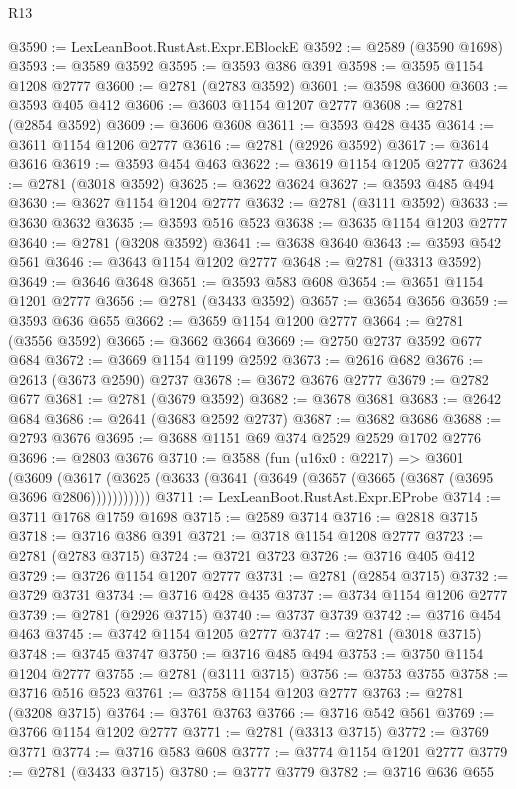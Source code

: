 \begin{lexlean}{R13}
\begin{coremodule}
@3590 := LexLeanBoot.RustAst.Expr.EBlockE
@3592 := @2589 (@3590 @1698)
@3593 := @3589 @3592
@3595 := @3593 @386 @391
@3598 := @3595 @1154 @1208 @2777
@3600 := @2781 (@2783 @3592)
@3601 := @3598 @3600
@3603 := @3593 @405 @412
@3606 := @3603 @1154 @1207 @2777
@3608 := @2781 (@2854 @3592)
@3609 := @3606 @3608
@3611 := @3593 @428 @435
@3614 := @3611 @1154 @1206 @2777
@3616 := @2781 (@2926 @3592)
@3617 := @3614 @3616
@3619 := @3593 @454 @463
@3622 := @3619 @1154 @1205 @2777
@3624 := @2781 (@3018 @3592)
@3625 := @3622 @3624
@3627 := @3593 @485 @494
@3630 := @3627 @1154 @1204 @2777
@3632 := @2781 (@3111 @3592)
@3633 := @3630 @3632
@3635 := @3593 @516 @523
@3638 := @3635 @1154 @1203 @2777
@3640 := @2781 (@3208 @3592)
@3641 := @3638 @3640
@3643 := @3593 @542 @561
@3646 := @3643 @1154 @1202 @2777
@3648 := @2781 (@3313 @3592)
@3649 := @3646 @3648
@3651 := @3593 @583 @608
@3654 := @3651 @1154 @1201 @2777
@3656 := @2781 (@3433 @3592)
@3657 := @3654 @3656
@3659 := @3593 @636 @655
@3662 := @3659 @1154 @1200 @2777
@3664 := @2781 (@3556 @3592)
@3665 := @3662 @3664
@3669 := @2750 @2737 @3592 @677 @684
@3672 := @3669 @1154 @1199 @2592
@3673 := @2616 @682
@3676 := @2613 (@3673 @2590) @2737
@3678 := @3672 @3676 @2777
@3679 := @2782 @677
@3681 := @2781 (@3679 @3592)
@3682 := @3678 @3681
@3683 := @2642 @684
@3686 := @2641 (@3683 @2592 @2737)
@3687 := @3682 @3686
@3688 := @2793 @3676
@3695 := @3688 @1151 @69 @374 @2529 @2529 @1702 @2776
@3696 := @2803 @3676
@3710 := @3588
    (fun (u16x0 : @2217) =>
    @3601
      (@3609 (@3617 (@3625 (@3633 (@3641 (@3649 (@3657 (@3665 (@3687 (@3695 @3696 @2806)))))))))))
@3711 := LexLeanBoot.RustAst.Expr.EProbe
@3714 := @3711 @1768 @1759 @1698
@3715 := @2589 @3714
@3716 := @2818 @3715
@3718 := @3716 @386 @391
@3721 := @3718 @1154 @1208 @2777
@3723 := @2781 (@2783 @3715)
@3724 := @3721 @3723
@3726 := @3716 @405 @412
@3729 := @3726 @1154 @1207 @2777
@3731 := @2781 (@2854 @3715)
@3732 := @3729 @3731
@3734 := @3716 @428 @435
@3737 := @3734 @1154 @1206 @2777
@3739 := @2781 (@2926 @3715)
@3740 := @3737 @3739
@3742 := @3716 @454 @463
@3745 := @3742 @1154 @1205 @2777
@3747 := @2781 (@3018 @3715)
@3748 := @3745 @3747
@3750 := @3716 @485 @494
@3753 := @3750 @1154 @1204 @2777
@3755 := @2781 (@3111 @3715)
@3756 := @3753 @3755
@3758 := @3716 @516 @523
@3761 := @3758 @1154 @1203 @2777
@3763 := @2781 (@3208 @3715)
@3764 := @3761 @3763
@3766 := @3716 @542 @561
@3769 := @3766 @1154 @1202 @2777
@3771 := @2781 (@3313 @3715)
@3772 := @3769 @3771
@3774 := @3716 @583 @608
@3777 := @3774 @1154 @1201 @2777
@3779 := @2781 (@3433 @3715)
@3780 := @3777 @3779
@3782 := @3716 @636 @655

\end{coremodule}
\end{lexlean}
